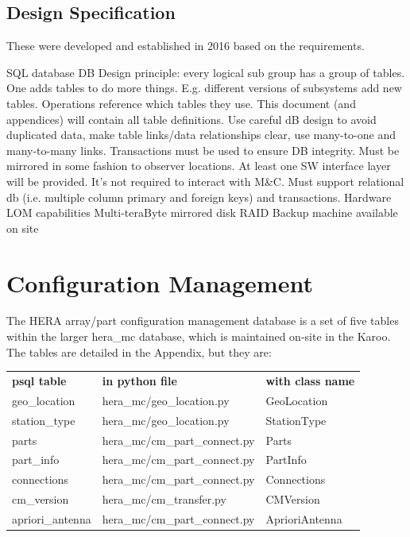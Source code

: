\documentclass{article}
\newcommand{\mc}{M\&C}
\begin{document}
\subsection{Design Specification}
These were developed and established in 2016 based on the requirements.

\begin{outline}[enumerate]
	\1 SQL database
		\2 DB Design principle: every logical sub group has a group of tables.  One adds tables to do more things. E.g. different versions of subsystems add new tables. Operations reference which tables they use.
		\2 This document (and appendices) will contain all table definitions.
		\2 Use careful dB design to avoid duplicated data, make table links/data relationships clear, use many-to-one and many-to-many links.
		\2 Transactions must be used to ensure DB integrity.
		\2 Must be mirrored in some fashion to observer locations.
	\1 At least one SW interface layer will be provided.
		\2 It's not required to interact with \mc.
		\2 Must support relational db (i.e. multiple column primary and foreign keys) and transactions.
	\1 Hardware
		\2 LOM capabilities
		\2 Multi-teraByte mirrored disk RAID
		\2 Backup machine available on site
\end{outline}




\section{Configuration Management}
\label{sec:config}

The HERA array/part configuration management database is a set of five tables within the larger hera\_mc database, which is maintained on-site in the Karoo.  The tables are detailed in the Appendix,
but they are:

\begin{center}
\begin{tabular}{l l l}
         {\bf psql table} & {\bf in python file}  &  {\bf with class name} \\
	geo\_location 	& hera\_mc/geo\_location.py & GeoLocation \\
	station\_type 	& hera\_mc/geo\_location.py & StationType \\
	parts 	& hera\_mc/cm\_part\_connect.py & Parts \\
	part\_info 	         & hera\_mc/cm\_part\_connect.py & PartInfo \\
	connections 	& hera\_mc/cm\_part\_connect.py & Connections \\
	cm\_version      & hera\_mc/cm\_transfer.py & CMVersion\\
	apriori\_antenna & hera\_mc/cm\_part\_connect.py & AprioriAntenna\
\end{tabular}
\end{center}
\end{document}
